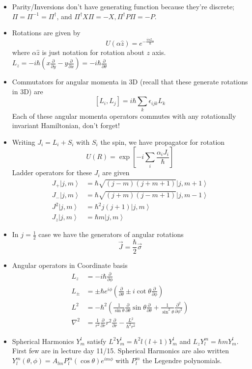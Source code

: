 \documentclass[10pt]{report}
\newcommand{\ket}[1]{\left|#1\right>}
\newcommand{\pd}[2]{\frac{\partial #1}{\partial#2}}
\newcommand{\ptd}[2]{\frac{\partial^2 #1}{\partial#2^2}}
\begin{document}
\begin{itemize}
	\item Parity/Inversions don't have generating function because they're discrete; $\Pi = \Pi^{-1} = \Pi^\dagger$, and $\Pi^\dagger X \Pi = -X, \Pi^\dagger P \Pi = -P$. 
	\item Rotations are given by 
		$$U(\alpha \hat{z}) = e^{-\frac{i\alpha L_z}{\hbar}}$$
		where $\alpha \hat{z}$ is just notation for rotation about $z$ axis. $L_z = -i\hbar\left( x\pd{}{y} - y\pd{}{x} \right) = -i\hbar \pd{}{\theta}$
	\item Commutators for angular momenta in 3D (recall that these generate rotations in 3D) are
		$$\left[ L_i, L_j \right] = i\hbar \sum_k \epsilon_{ijk}L_k$$
		Each of these angular momenta operators commutes with any rotationally invariant Hamiltonian, don't forget!
    \item Writing $J_i = L_i + S_i$ with $S_i$ the spin, we have propagator for rotation
        $$U(R) = \exp \left[ -i \sum_{i} \frac{\alpha_iJ_i}{\hbar} \right]$$
        Ladder operators for these $J_i$ are given
        \begin{align}
            J_+ \ket{j,m} &= \hbar \sqrt{(j-m)(j+m+1)}\ket{j,m+1}\\
            J_- \ket{j,m} &= \hbar \sqrt{(j+m)(j-m+1)}\ket{j,m-1}\\
            J^2\ket{j,m} &= \hbar^2 j(j+1)\ket{j,m}\\
            J_z\ket{j,m} &= \hbar m \ket{j,m}
        \end{align}
    \item In $j=\frac{1}{2}$ case we have the generators of angular rotations
        $$\vec{J} = \frac{\hbar}{2}\vec{\sigma}$$
    \item Angular operators in Coordinate basis
        \begin{align}
            L_z &= -i\hbar \pd{}{\phi}\\
            L_{\pm} &= \pm\hbar e^{i\phi}\left( \pd{}{\theta} \pm i\cot \theta \pd{}{\phi} \right)\\
            L^2 &= -\hbar^2\left( \frac{1}{\sin\theta}\pd{}{\theta}\sin\theta\pd{}{\theta} + \frac{1}{\sin^2\theta} \ptd{}{\phi} \right)\\
            \nabla^2 &= \frac{1}{r^2}\pd{}{r}r^2\pd{}{r} - \frac{L^2}{\hbar^2 r^2}
        \end{align}
    \item Spherical Harmonics $Y_m^l$ satisfy $L^2Y_m^l = \hbar^2l(l+1)Y_m^l$ and $L_zY_l^m = \hbar m Y_m^l$. First few are in lecture day 11/15. Spherical Harmonics are also written $Y_l^m(\theta,\phi) = A_{lm}P_l^m(\cos\theta)e^{im\phi}$ with $P_l^m$ the Legendre polynomials.

\end{itemize}
\end{document}
